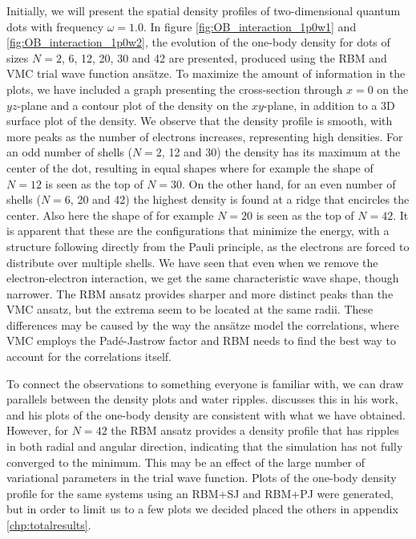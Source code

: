 Initially, we will present the spatial density profiles of two-dimensional quantum dots with frequency $\omega=1.0$. In figure \eqref{fig:OB_interaction_1p0w1} and \eqref{fig:OB_interaction_1p0w2}, the evolution of the one-body density for dots of sizes $N=2$, 6, 12, 20, 30 and 42 are presented, produced using the RBM and VMC trial wave function ansätze. To maximize the amount of information in the plots, we have included a graph presenting the cross-section through $x=0$ on the $yz$-plane and a contour plot of the density on the $xy$-plane, in addition to a 3D surface plot of the density. We observe that the density profile is smooth, with more peaks as the number of electrons increases, representing high densities. For an odd number of shells ($N=2$, 12 and 30) the density has its maximum at the center of the dot, resulting in equal shapes where for example the shape of $N=12$ is seen as the top of $N=30$. On the other hand, for an even number of shells ($N=6$, 20 and 42) the highest density is found at a ridge that encircles the center. Also here the shape of for example $N=20$ is seen as the top of $N=42$. It is apparent that these are the configurations that minimize the energy, with a structure following directly from the Pauli principle, as the electrons are forced to distribute over multiple shells. We have seen that even when we remove the electron-electron interaction, we get the same characteristic wave shape, though narrower. The RBM ansatz provides sharper and more distinct peaks than the VMC ansatz, but the extrema seem to be located at the same radii. These differences may be caused by the way the ansätze model the correlations, where VMC employs the Padé-Jastrow factor and RBM needs to find the best way to account for the correlations itself. 

To connect the observations to something everyone is familiar with, we can draw parallels between the density plots and water ripples. \citet{hogberget_quantum_2013} discusses this in his work, and his plots of the one-body density are consistent with what we have obtained. However, for $N=42$ the RBM ansatz provides a density profile that has ripples in both radial and angular direction, indicating that the simulation has not fully converged to the minimum. This may be an effect of the large number of variational parameters in the trial wave function. Plots of the one-body density profile for the same systems using an RBM+SJ and RBM+PJ were generated, but in order to limit us to a few plots we decided placed the others in appendix \ref{chp:totalresults}.

